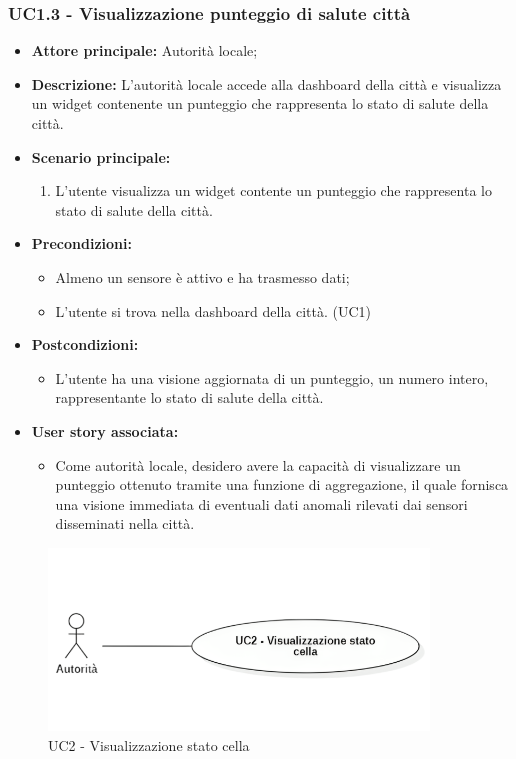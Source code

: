 \documentclass{article}
\begin{document}
\subsubsection{UC1.3 - Visualizzazione punteggio di salute città}
\begin{itemize}
    \item \textbf{Attore principale:} Autorità locale;
    \item \textbf{Descrizione:} L'autorità locale accede alla dashboard della città e visualizza un widget contenente un punteggio che rappresenta lo stato di salute della città.
    \item \textbf{Scenario principale:}
          \begin{enumerate}
              \item L'utente visualizza un widget contente un punteggio che rappresenta lo stato di salute della città.
          \end{enumerate}
    \item \textbf{Precondizioni:}
          \begin{itemize}
              \item Almeno un sensore è attivo e ha trasmesso dati;
              \item L'utente si trova nella dashboard della città. (UC1)
          \end{itemize}
    \item \textbf{Postcondizioni:}
          \begin{itemize}
              \item      L'utente ha una visione aggiornata di un punteggio, un numero intero, rappresentante lo stato di salute della città.
          \end{itemize}
    \item \textbf{User story associata:}
          \begin{itemize}
              \item Come autorità locale, desidero avere la capacità di visualizzare un punteggio ottenuto tramite una funzione di aggregazione, il quale fornisca una visione immediata di eventuali dati anomali rilevati dai sensori disseminati nella città.
          \end{itemize}
\end{itemize}

\begin{figure}[H]
    \centering
    \includegraphics[width=0.9\textwidth]{Images/uc2.png}
    \caption{UC2 - Visualizzazione stato cella}
    \label{fig:UC2}
\end{figure}
\end{document}
